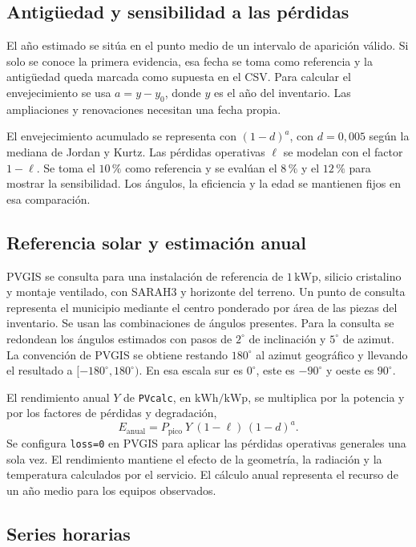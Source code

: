 \documentclass[11pt,a4paper]{article}
\begin{document}
\subsection{Antigüedad y sensibilidad a las pérdidas}

El año estimado se sitúa en el punto medio de un intervalo de aparición válido. Si solo se conoce la primera evidencia, esa fecha se toma como referencia y la antigüedad queda marcada como supuesta en el CSV. Para calcular el envejecimiento se usa \(a=y-y_0\), donde \(y\) es el año del inventario. Las ampliaciones y renovaciones necesitan una fecha propia.

El envejecimiento acumulado se representa con \((1-d)^a\), con \(d=0{,}005\) según la mediana de Jordan y Kurtz. Las pérdidas operativas \(\ell\) se modelan con el factor \(1-\ell\). Se toma el \(10\,\%\) como referencia y se evalúan el \(8\,\%\) y el \(12\,\%\) para mostrar la sensibilidad. Los ángulos, la eficiencia y la edad se mantienen fijos en esa comparación. \cite{degradacion}

\subsection{Referencia solar y estimación anual}

PVGIS se consulta para una instalación de referencia de \(1\,\mathrm{kWp}\), silicio cristalino y montaje ventilado, con SARAH3 y horizonte del terreno. Un punto de consulta representa el municipio mediante el centro ponderado por área de las piezas del inventario. Se usan las combinaciones de ángulos presentes. Para la consulta se redondean los ángulos estimados con pasos de \(2^\circ\) de inclinación y \(5^\circ\) de azimut. La convención de PVGIS se obtiene restando \(180^\circ\) al azimut geográfico y llevando el resultado a \([-180^\circ,180^\circ)\). En esa escala sur es \(0^\circ\), este es \(-90^\circ\) y oeste es \(90^\circ\). \cite{pvgis}

El rendimiento anual \(Y\) de \texttt{PVcalc}, en \(\mathrm{kWh/kWp}\), se multiplica por la potencia y por los factores de pérdidas y degradación,
\[
E_{\mathrm{anual}}=P_{\mathrm{pico}}\ Y\ (1-\ell)\,(1-d)^a.
\]
Se configura \texttt{loss=0} en PVGIS para aplicar las pérdidas operativas generales una sola vez. El rendimiento mantiene el efecto de la geometría, la radiación y la temperatura calculados por el servicio. El cálculo anual representa el recurso de un año medio para los equipos observados.

\subsection{Series horarias}
\end{document}
